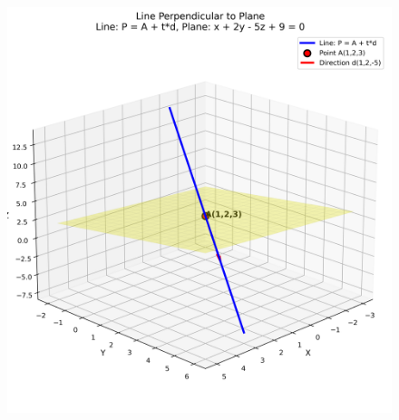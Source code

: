 \documentclass[journal]{IEEEtran}
\numberwithin{equation}{enumi}
\numberwithin{figure}{enumi}
\begin{document}
		\begin{figure}[h!]
			\centering
			\includegraphics[width=0.9\linewidth]{figs/line_perpendicular}
			\caption{}
			\label{fig:lineperpendicular}
		\end{figure}
		
	
\end{document}
